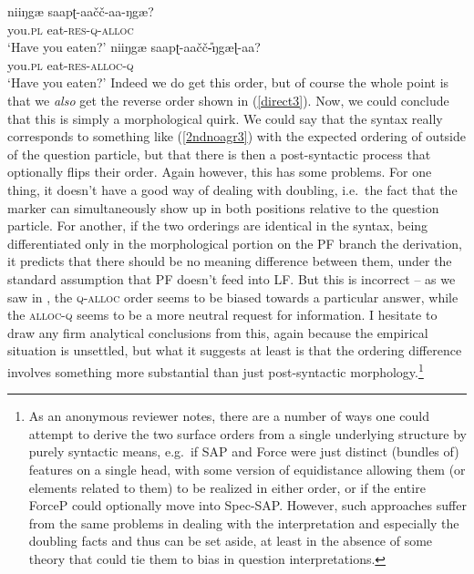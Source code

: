 \documentclass[output=paper, modfonts, nonflat]{langsci/langscibook}
\begin{document}
\ea
 \ea\label{2ndnoagr3}\gll niiŋgæ{} saapʈ-aa\v{c}\v{c}-aa-ŋgæ?\\
 you.\textsc{pl}{} eat-\textsc{res}-\textsc{q}-\textsc{alloc}\\
 \glt `Have you eaten?'
 \ex\label{direct3}\gll niiŋgæ{} saapʈ-aa\v{c}\v{c}\U-ŋgæɭ-aa?\\
 you.\textsc{pl}{} eat-\textsc{res}-\textsc{alloc}-\textsc{q}\\ 
 \glt `Have you eaten?' 
 \z
\z
%
Indeed we do get this order, but of course the whole point is that we
\emph{also} get the reverse order shown in (\ref{direct3}). Now, we
could conclude that this is simply a morphological quirk. We could say
that the syntax really corresponds to something like (\ref{2ndnoagr3})
with the expected ordering of \allagr{} outside of the question
particle, but that there is then a post-syntactic process that
optionally flips their order.  Again however, this has some
problems. For one thing, it doesn't have a good way of dealing with
doubling, i.e.\ the fact that the \allagr{} marker can simultaneously
show up in both positions relative to the question particle. For
another, if the two orderings are identical in the syntax, being
differentiated only in the morphological portion on the PF branch the
derivation, it predicts that there should be no meaning difference
between them, under the standard assumption that PF doesn't feed into
LF. But this is incorrect -- as we saw in , 
the \textsc{q}-\textsc{alloc}{} order seems to be biased
towards a particular answer, while the \textsc{alloc}{}-\textsc{q} seems to be
a more neutral request for information. I hesitate to draw any firm
analytical conclusions from this, again because the empirical
situation is unsettled, but what it suggests at least is that the
ordering difference involves something more substantial than just
post-syntactic morphology.\footnote{As an anonymous reviewer notes,
  there are a number of ways one could attempt to derive the two
  surface orders from a single underlying structure by purely
  syntactic means, e.g.\ if SAP and Force were just distinct (bundles
  of) features on a single head, with some version of equidistance
  allowing them (or elements related to them) to be realized in either
  order, or if the entire ForceP could optionally move into
  Spec-SAP. However, such approaches suffer from the same problems in
  dealing with the interpretation and especially the doubling facts
  and thus can be set aside, at least in the absence of some theory
  that could tie them to bias in question interpretations.}
\end{document}
